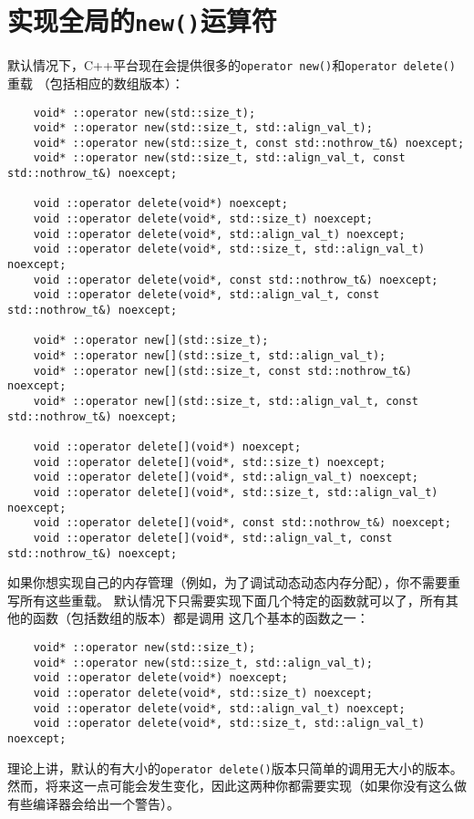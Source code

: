 \section{实现全局的\texttt{new()}运算符}\label{ch30.3}
默认情况下，C++平台现在会提供很多的\texttt{operator new()}和\texttt{operator delete()}重载
（包括相应的数组版本）：
\begin{lstlisting}
    void* ::operator new(std::size_t);
    void* ::operator new(std::size_t, std::align_val_t);
    void* ::operator new(std::size_t, const std::nothrow_t&) noexcept;
    void* ::operator new(std::size_t, std::align_val_t, const std::nothrow_t&) noexcept;

    void ::operator delete(void*) noexcept;
    void ::operator delete(void*, std::size_t) noexcept;
    void ::operator delete(void*, std::align_val_t) noexcept;
    void ::operator delete(void*, std::size_t, std::align_val_t) noexcept;
    void ::operator delete(void*, const std::nothrow_t&) noexcept;
    void ::operator delete(void*, std::align_val_t, const std::nothrow_t&) noexcept;

    void* ::operator new[](std::size_t);
    void* ::operator new[](std::size_t, std::align_val_t);
    void* ::operator new[](std::size_t, const std::nothrow_t&) noexcept;
    void* ::operator new[](std::size_t, std::align_val_t, const std::nothrow_t&) noexcept;

    void ::operator delete[](void*) noexcept;
    void ::operator delete[](void*, std::size_t) noexcept;
    void ::operator delete[](void*, std::align_val_t) noexcept;
    void ::operator delete[](void*, std::size_t, std::align_val_t) noexcept;
    void ::operator delete[](void*, const std::nothrow_t&) noexcept;
    void ::operator delete[](void*, std::align_val_t, const std::nothrow_t&) noexcept;
\end{lstlisting}
如果你想实现自己的内存管理（例如，为了调试动态动态内存分配），你不需要重写所有这些重载。
默认情况下只需要实现下面几个特定的函数就可以了，所有其他的函数（包括数组的版本）都是调用
这几个基本的函数之一：
\begin{lstlisting}
    void* ::operator new(std::size_t);
    void* ::operator new(std::size_t, std::align_val_t);
    void ::operator delete(void*) noexcept;
    void ::operator delete(void*, std::size_t) noexcept;
    void ::operator delete(void*, std::align_val_t) noexcept;
    void ::operator delete(void*, std::size_t, std::align_val_t) noexcept;
\end{lstlisting}
理论上讲，默认的有大小的\texttt{operator delete()}版本只简单的调用无大小的版本。
然而，将来这一点可能会发生变化，因此这两种你都需要实现（如果你没有这么做有些编译器会给出一个警告）。

